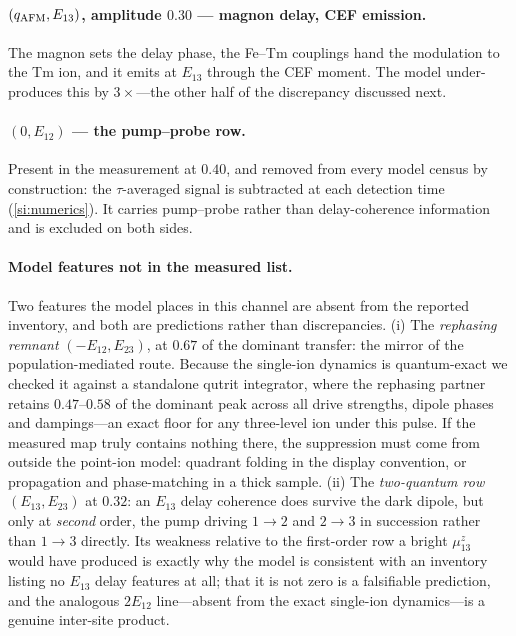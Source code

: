 \documentclass[11pt]{article}
\newcommand{\qafm}{q_{\rm AFM}}
\begin{document}
\paragraph{$(\qafm,E_{13})$, amplitude $0.30$ --- magnon delay, CEF
emission.}
The magnon sets the delay phase, the Fe--Tm couplings hand the
modulation to the Tm ion, and it emits at $E_{13}$ through the CEF
moment.  The model under-produces this by $3\times$---the other half of
the discrepancy discussed next.

\paragraph{$(0,E_{12})$ --- the pump--probe row.}
Present in the measurement at $0.40$, and removed from every model
census by construction: the $\tau$-averaged signal is subtracted at each
detection time (\cref{si:numerics}).  It carries pump--probe rather than
delay-coherence information and is excluded on both sides.

\paragraph{Model features not in the measured list.}
Two features the model places in this channel are absent from the
reported inventory, and both are predictions rather than
discrepancies.  (i) The \emph{rephasing remnant} $(-E_{12},E_{23})$, at
$0.67$ of the dominant transfer: the mirror of the
population-mediated route.  Because the single-ion dynamics is
quantum-exact we checked it against a standalone qutrit integrator,
where the rephasing partner retains $0.47$--$0.58$ of the dominant peak
across all drive strengths, dipole phases and dampings---an exact floor
for any three-level ion under this pulse.  If the measured map truly
contains nothing there, the suppression must come from outside the
point-ion model: quadrant folding in the display convention, or
propagation and phase-matching in a thick sample.  (ii) The
\emph{two-quantum row} $(E_{13},E_{23})$ at $0.32$: an $E_{13}$ delay
coherence does survive the dark dipole, but only at \emph{second} order,
the pump driving $1\!\to\!2$ and $2\!\to\!3$ in succession rather than
$1\!\to\!3$ directly.  Its weakness relative to the first-order row a
bright $\mu^z_{13}$ would have produced is exactly why the model is
consistent with an inventory listing no $E_{13}$ delay features at all;
that it is not zero is a falsifiable prediction, and the analogous
$2E_{12}$ line---absent from the exact single-ion dynamics---is a
genuine inter-site product.
\end{document}
